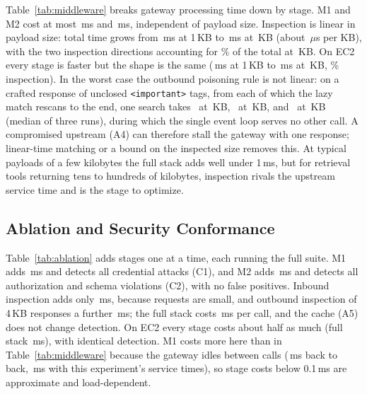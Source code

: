 \documentclass{ieeeaccess}
\newcommand{\ms}{\,ms\xspace}
\begin{document}
Table~\ref{tab:middleware} breaks gateway processing time down by stage. M1 and M2 cost at most \mAuthMax\ms and \mRbacMax\ms, independent of payload size. Inspection is linear in payload size: total time grows from \mOneKB\ms at 1\,KB to \mBigKB\ms at \mBigSize\,KB (about \mPerKB\,$\mu$s per KB), with the two inspection directions accounting for \mDpiShareBig\% of the total at \mBigSize\,KB. On EC2 every stage is faster but the shape is the same (\awMidSmall\ms at 1\,KB to \awMidBig\ms at \mBigSize\,KB, \awMidDpiShareBig\% inspection). In the worst case the outbound poisoning rule is not linear: on a crafted response of unclosed \texttt{<important>} tags, from each of which the lazy match rescans to the end, one search takes \wcCraftedSmall\ at \wcKbSmall\,KB, \wcCraftedMid\ at \wcKbMid\,KB, and \wcCraftedBig\ at \wcKbBig\,KB (median of three runs), during which the single event loop serves no other call. A compromised upstream (A4) can therefore stall the gateway with one response; linear-time matching or a bound on the inspected size removes this. At typical payloads of a few kilobytes the full stack adds well under 1\ms, but for retrieval tools returning tens to hundreds of kilobytes, inspection rivals the upstream service time and is the stage to optimize.

\subsection{Ablation and Security Conformance}
\label{sec:res-security}





Table~\ref{tab:ablation} adds stages one at a time, each running the full suite. M1 adds \abOverheadAuth\ms and detects all credential attacks (C1), and M2 adds \abOverheadRbac\ms and detects all authorization and schema violations (C2), with no false positives. Inbound inspection adds only \abOverheadIn\ms, because requests are small, and outbound inspection of 4\,KB responses a further \abOverheadOut\ms; the full stack costs \abOverheadFull\ms per call, and the cache (A5) does not change detection. On EC2 every stage costs about half as much (full stack \awAbOverheadFull\ms), with identical detection. M1 costs more here than in Table~\ref{tab:middleware} because the gateway idles between calls (\igMone\ms back to back, \igMabl\ms with this experiment's service times), so stage costs below 0.1\ms are approximate and load-dependent.
\end{document}
